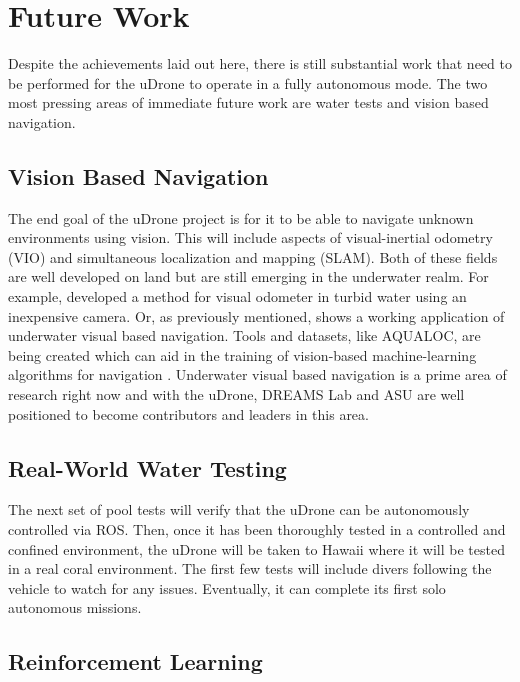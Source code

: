 \section{Future Work}\label{future-work}

Despite the achievements laid out here, there is still substantial work that need to be performed for the uDrone to operate in a fully autonomous mode. The two most pressing areas of immediate future work are water tests and vision based navigation.

\subsection{Vision Based Navigation}

The end goal of the uDrone project is for it to be able to navigate unknown environments using vision. This will include aspects of visual-inertial odometry (VIO) and simultaneous localization and mapping (SLAM). Both of these fields are well developed on land but are still emerging in the underwater realm. For example, \cite{mono-vio} developed a method for visual odometer in turbid water using an inexpensive camera. Or, as previously mentioned, \cite{manderson2020visionbased} shows a working application of underwater visual based navigation. Tools and datasets, like AQUALOC, are being created which can aid in the training of vision-based machine-learning algorithms for navigation \parencite{aqualoc}. Underwater visual based navigation is a prime area of research right now and with the uDrone, DREAMS Lab and ASU are well positioned to become contributors and leaders in this area. 

\subsection{Real-World Water Testing}
The next set of pool tests will verify that the uDrone can be autonomously controlled via ROS. Then, once it has been thoroughly tested in a controlled and confined environment, the uDrone will be taken to Hawaii where it will be tested in a real coral environment. The first few tests will include divers following the vehicle to watch for any issues. Eventually, it can complete its first solo autonomous missions.

\subsection{Reinforcement Learning}

